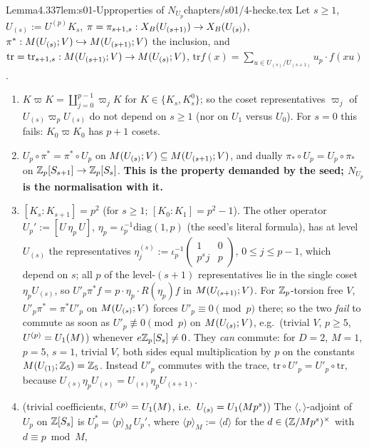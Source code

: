 \begin{quoted}{Lemma}{4.3}{37}{lem:s01-Up}{properties of $N_{U_p}$}{chapters/s01/4-hecke.tex}\label{rpt:lem:s01-Up}
Let $s\ge1$, $U_{(s)}:=U^{(p)}K_s$, $\pi=\pi_{s+1,s}:X_B(U_{(s+1)})\to X_B(U_{(s)})$, $\pi^*:M(U_{(s)};V)\hookrightarrow M(U_{(s+1)};V)$
the inclusion, and $\mathrm{tr}=\mathrm{tr}_{s+1,s}:M(U_{(s+1)};V)\to M(U_{(s)};V)$,
$\mathrm{tr}f(x)=\sum_{u\in U_{(s)}/U_{(s+1)}}u_p\cdot f(xu)$.
\begin{enumerate}[label=(\alph*)]
\item $K\varpi K=\coprod_{j=0}^{p-1}\varpi_jK$ for $K\in\{K_s,K^0_s\}$; so the coset representatives $\varpi_j$ of $U_{(s)}\varpi_pU_{(s)}$ do
  not depend on $s\ge1$ (nor on $U_1$ versus $U_0$). For $s=0$ this fails: $K_0\varpi K_0$ has $p+1$ cosets.
\item $U_p\circ\pi^*=\pi^*\circ U_p$ on $M(U_{(s)};V)\subseteq M(U_{(s+1)};V)$, and dually $\pi_*\circ U_p=U_p\circ\pi_*$
  on $\mathbb{Z}_p[S_{s+1}]\to\mathbb{Z}_p[S_s]$. \textbf{This is the property demanded by the seed; $N_{U_p}$ is the normalisation with it.}
\item $[K_s:K_{s+1}]=p^2$ (for $s\ge1$; $[K_0:K_1]=p^2-1$). The other operator $U_p':=[U\,\eta_p\,U]$, $\eta_p=\iota_p^{-1}\mathrm{diag}(1,p)$
  (the seed's literal formula), has at level $U_{(s)}$ the representatives
  $\eta^{(s)}_j:=\iota_p^{-1}\left(\begin{smallmatrix}1&0\\p^sj&p\end{smallmatrix}\right)$, $0\le j\le p-1$, which depend on $s$; all $p$ of the
  level-$(s+1)$ representatives lie in the single coset $\eta_pU_{(s)}$, so $U'_p\pi^*f=p\cdot\eta_p\cdot R(\eta_p)f$ in
  $M(U_{(s+1)};V)$. For $\mathbb{Z}_p$-torsion free $V$, $U'_p\pi^*=\pi^*U'_p$ on $M(U_{(s)};V)$ forces
  $U'_p\equiv0\pmod p$ there; so the two \emph{fail} to commute as soon as $U'_p\not\equiv0\pmod p$ on $M(U_{(s)};V)$, e.g.\
  (trivial $V$, $p\ge5$, $U^{(p)}=U_1(M)$) whenever $e\mathbb{Z}_p[S_s]\ne0$. They \emph{can} commute: for $D=2$, $M=1$, $p=5$, $s=1$, trivial $V$, both sides
  equal multiplication by $p$ on the constants $M(U_{(1)};\mathbb{Z}_5)=\mathbb{Z}_5$. Instead $U'_p$
  commutes with the trace, $\mathrm{tr}\circ U'_p=U'_p\circ\mathrm{tr}$, because $U_{(s)}\eta_pU_{(s)}=U_{(s)}\eta_pU_{(s+1)}$.
\item (trivial coefficients, $U^{(p)}=U_1(M)$, i.e.\ $U_{(s)}=U_1(Mp^s)$) The $\langle,\rangle$-adjoint of $U_p$ on $\mathbb{Z}[S_s]$ is
  $U_p^*=\langle p\rangle_M\,U_p'$, where $\langle p\rangle_M:=\langle d\rangle$ for the $d\in(\mathbb{Z}/Mp^s)^\times$ with $d\equiv p\bmod M$,

\end{enumerate}
\end{quoted}
